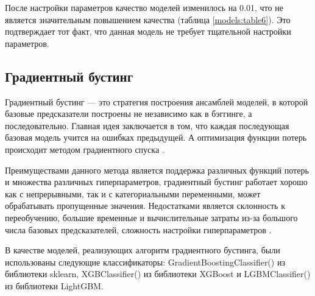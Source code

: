 \documentclass[14pt]{mmcs_article}
\begin{document}
После настройки параметров качество моделей изменилось на 0.01, что не является значительным повышением качества (таблица \ref{models:table6}). Это подтверждает тот факт, что данная модель не требует тщательной настройки параметров.

\subsection{Градиентный бустинг}

Градиентный бустинг --- это стратегия построения ансамблей моделей, в которой базовые предсказатели построены не независимо как в бэггинге, а последовательно. Главная идея заключается в том, что каждая последующая базовая модель учится на ошибках предыдущей. А оптимизация функции потерь происходит методом градиентного спуска \cite{lib:gradboost}.

Преимуществами данного метода является поддержка различных функций потерь и множества различных гиперпараметров, градиентный бустинг работает хорошо как с непрерывными, так и с категориальными переменными, может обрабатывать пропущенные значения. Недостатками является склонность к переобучению, большие временные и вычислительные затраты из-за большого числа базовых предсказателей, сложность настройки гиперпараметров \cite{lib:gradboost2}.

В качестве моделей, реализующих алгоритм градиентного бустинга, были использованы следующие классификаторы: GradientBoostingClassifier() из библиотеки sklearn, XGBClassifier() из библиотеки XGBoost и LGBMClassifier() из библиотеки LightGBM.
\end{document}
